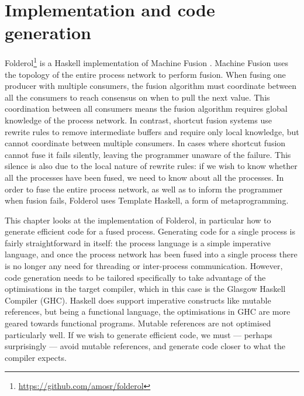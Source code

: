 \chapter{Implementation and code generation}
\label{chapter:process:implementation}


Folderol\footnote{\url{https://github.com/amosr/folderol}} is a Haskell implementation of Machine Fusion .
Machine Fusion uses the topology of the entire process network to perform fusion.
When fusing one producer with multiple consumers, the fusion algorithm must coordinate between all the consumers to reach consensus on when to pull the next value.
This coordination between all consumers means the fusion algorithm requires global knowledge of the process network.
In contrast, shortcut fusion systems  use rewrite rules to remove intermediate buffers and require only local knowledge, but cannot coordinate between multiple consumers.
In cases where shortcut fusion cannot fuse it fails silently, leaving the programmer unaware of the failure.
This silence is also due to the local nature of rewrite rules: if we wish to know whether all the processes have been fused, we need to know about all the processes.
In order to fuse the entire process network, as well as to inform the programmer when fusion fails, Folderol uses Template Haskell, a form of metaprogramming.

This chapter looks at the implementation of Folderol, in particular how to generate efficient code for a fused process.
Generating code for a single process is fairly straightforward in itself: the process language is a simple imperative language, and once the process network has been fused into a single process there is no longer any need for threading or inter-process communication.
However, code generation needs to be tailored specifically to take advantage of the optimisations in the target compiler, which in this case is the Glasgow Haskell Compiler (GHC).
Haskell does support imperative constructs like mutable references, but being a functional language, the optimisations in GHC are more geared towards functional programs.
Mutable references are not optimised particularly well.
If we wish to generate efficient code, we must --- perhaps surprisingly --- avoid mutable references, and generate code closer to what the compiler expects.

